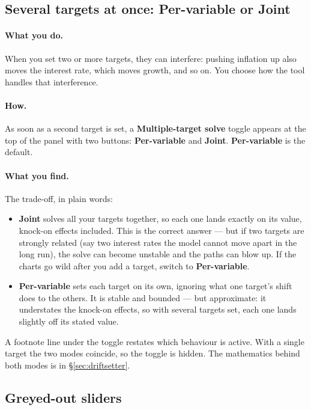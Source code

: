 \documentclass[11pt]{article}
\theoremstyle{definition}
\theoremstyle{remark}
\begin{document}
\subsection{Several targets at once: Per-variable or Joint}

\paragraph{What you do.} When you set two or more targets, they can interfere: pushing
inflation up also moves the interest rate, which moves growth, and so on. You choose
how the tool handles that interference.

\paragraph{How.} As soon as a second target is set, a \textbf{Multiple-target solve}
toggle appears at the top of the panel with two buttons: \textbf{Per-variable} and
\textbf{Joint}. \textbf{Per-variable} is the default.

\paragraph{What you find.} The trade-off, in plain words:
\begin{itemize}
  \item \textbf{Joint} solves all your targets together, so each one lands exactly on
    its value, knock-on effects included. This is the correct answer --- but if two
    targets are strongly related (say two interest rates the model cannot move apart
    in the long run), the solve can become unstable and the paths can blow up. If the
    charts go wild after you add a target, switch to \textbf{Per-variable}.
  \item \textbf{Per-variable} sets each target on its own, ignoring what one target's
    shift does to the others. It is stable and bounded --- but approximate: it
    understates the knock-on effects, so with several targets set, each one lands
    slightly off its stated value.
\end{itemize}
A footnote line under the toggle restates which behaviour is active. With a single
target the two modes coincide, so the toggle is hidden. The mathematics behind both
modes is in \S\ref{sec:driftsetter}.

\subsection{Greyed-out sliders}
\end{document}
